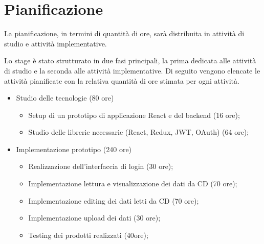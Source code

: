 \newpage

\section{Pianificazione}

La pianificazione, in termini di quantità di ore, sarà distribuita in attività di studio e attività implementative.

Lo stage è stato strutturato in due fasi principali, la prima dedicata alle attività di studio e la seconda alle attività implementative. Di seguito vengono elencate le attività pianificate con la relativa quantità di ore stimata per ogni attività.

\begin{itemize}
  \item Studio delle tecnologie (80 ore)
        \begin{itemize}
          \item Setup di un prototipo di applicazione React e del backend (16 ore);
          \item Studio delle librerie necessarie (React, Redux, JWT, OAuth) (64 ore);
        \end{itemize}
  \item Implementazione prototipo (240 ore)
        \begin{itemize}
          \item Realizzazione dell’interfaccia di login (30 ore);
          \item Implementazione lettura e visualizzazione dei dati da CD (70 ore);
          \item Implementazione editing dei dati letti da CD (70 ore);
          \item Implementazione upload dei dati (30 ore);
          \item Testing dei prodotti realizzati (40ore);
        \end{itemize}
\end{itemize}

